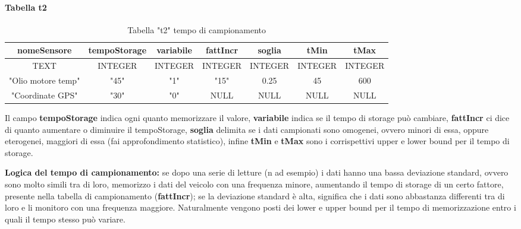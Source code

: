\documentclass[12pt, a4paper, italian]{report}
\numberwithin{figure}{chapter}
\numberwithin{table}{chapter}
\begin{document}
\paragraph{Tabella t2}
\begin{table}[h!]
  \centering 
  \begin{adjustbox}{max width=\textwidth}
    \begin{tabular}{|c|c|c|c|c|c|c|}
      \hline
      \textbf{nomeSensore} & \textbf{tempoStorage} & \textbf{variabile} & \textbf{fattIncr} & \textbf{soglia} & \textbf{tMin} & \textbf{tMax} \\
      \hline
      TEXT & INTEGER & INTEGER & INTEGER & INTEGER & INTEGER & INTEGER \\
      \hline
      "Olio motore temp" & "45" & "1" & "15" & 0.25 & 45 & 600 \\
      \hline
      "Coordinate GPS" & "30" & "0" & NULL & NULL & NULL & NULL \\
      \hline
    \end{tabular}
  \end{adjustbox}
  \caption{Tabella "t2" tempo di campionamento}
  \label{tab:t2 campionamento}
\end{table}
Il campo \textbf{tempoStorage} indica ogni quanto memorizzare il valore, \textbf{variabile} indica se il tempo di storage può cambiare, \textbf{fattIncr} ci dice di quanto aumentare o diminuire il tempoStorage, \textbf{soglia} delimita se i dati campionati sono omogenei, ovvero minori di essa, oppure eterogenei, maggiori di essa (fai approfondimento statistico), infine \textbf{tMin} e \textbf{tMax} sono i corrispettivi upper e lower bound per il tempo di storage.

\textbf{Logica del tempo di campionamento:} se dopo una serie di letture (n ad esempio) i dati hanno una bassa deviazione standard, ovvero sono molto simili tra di loro, memorizzo i dati del veicolo con una frequenza minore, aumentando il tempo di storage di un certo fattore, presente nella tabella di campionamento (\textbf{fattIncr}); se la deviazione standard è alta, significa che i dati sono abbastanza differenti tra di loro e li monitoro con una frequenza maggiore. Naturalmente vengono posti dei lower e upper bound per il tempo di memorizzazione entro i quali il tempo stesso può variare.
\end{document}

